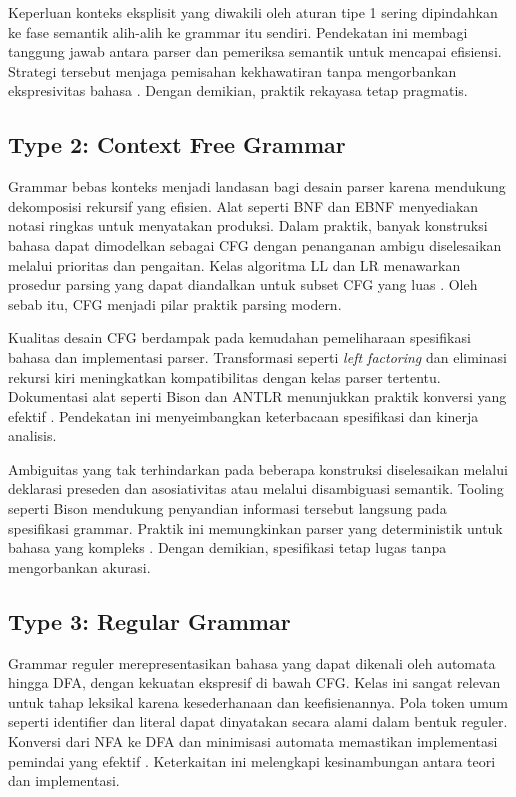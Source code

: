 \documentclass[../main.tex]{subfiles}
\begin{document}
Keperluan konteks eksplisit yang diwakili oleh aturan tipe 1 sering dipindahkan ke fase semantik alih-alih ke grammar itu sendiri. Pendekatan ini membagi tanggung jawab antara parser dan pemeriksa semantik untuk mencapai efisiensi. Strategi tersebut menjaga pemisahan kekhawatiran tanpa mengorbankan ekspresivitas bahasa \citep{WikiChomsky}. Dengan demikian, praktik rekayasa tetap pragmatis.

\subsection{Type 2: Context Free Grammar}
Grammar bebas konteks menjadi landasan bagi desain parser karena mendukung dekomposisi rekursif yang efisien. Alat seperti BNF dan EBNF menyediakan notasi ringkas untuk menyatakan produksi. Dalam praktik, banyak konstruksi bahasa dapat dimodelkan sebagai CFG dengan penanganan ambigu diselesaikan melalui prioritas dan pengaitan. Kelas algoritma LL dan LR menawarkan prosedur parsing yang dapat diandalkan untuk subset CFG yang luas \citep{WikiLL,WikiLR}. Oleh sebab itu, CFG menjadi pilar praktik parsing modern.

Kualitas desain CFG berdampak pada kemudahan pemeliharaan spesifikasi bahasa dan implementasi parser. Transformasi seperti \emph{left factoring} dan eliminasi rekursi kiri meningkatkan kompatibilitas dengan kelas parser tertentu. Dokumentasi alat seperti Bison dan ANTLR menunjukkan praktik konversi yang efektif \citep{BisonManual,ANTLRDocs}. Pendekatan ini menyeimbangkan keterbacaan spesifikasi dan kinerja analisis.

Ambiguitas yang tak terhindarkan pada beberapa konstruksi diselesaikan melalui deklarasi preseden dan asosiativitas atau melalui disambiguasi semantik. Tooling seperti Bison mendukung penyandian informasi tersebut langsung pada spesifikasi grammar. Praktik ini memungkinkan parser yang deterministik untuk bahasa yang kompleks \citep{BisonManual}. Dengan demikian, spesifikasi tetap lugas tanpa mengorbankan akurasi.

\subsection{Type 3: Regular Grammar}
Grammar reguler merepresentasikan bahasa yang dapat dikenali oleh automata hingga DFA, dengan kekuatan ekspresif di bawah CFG. Kelas ini sangat relevan untuk tahap leksikal karena kesederhanaan dan keefisienannya. Pola token umum seperti identifier dan literal dapat dinyatakan secara alami dalam bentuk reguler. Konversi dari NFA ke DFA dan minimisasi automata memastikan implementasi pemindai yang efektif \citep{WikiRegex,WikiNFA,WikiDFA,WikiDFAMin}. Keterkaitan ini melengkapi kesinambungan antara teori dan implementasi.
\end{document}
